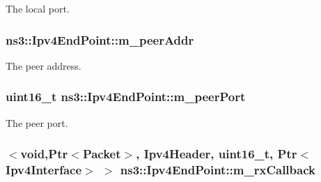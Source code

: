 The local port. 

\subsubsection[{\texorpdfstring{m\+\_\+peer\+Addr}{m_peerAddr}}]{ ns3\+::\+Ipv4\+End\+Point\+::m\+\_\+peer\+Addr\hspace{0.3cm}{\ttfamily [private]}}\hypertarget{classns3_1_1Ipv4EndPoint_a8c44fb581a066c052302912a5ade04b2}{}\label{classns3_1_1Ipv4EndPoint_a8c44fb581a066c052302912a5ade04b2}


The peer address. 

\subsubsection[{\texorpdfstring{m\+\_\+peer\+Port}{m_peerPort}}]{\setlength{\rightskip}{0pt plus 5cm}uint16\+\_\+t ns3\+::\+Ipv4\+End\+Point\+::m\+\_\+peer\+Port\hspace{0.3cm}{\ttfamily [private]}}\hypertarget{classns3_1_1Ipv4EndPoint_a90c4b5fd81d6d3d7628eb36f1c42f16a}{}\label{classns3_1_1Ipv4EndPoint_a90c4b5fd81d6d3d7628eb36f1c42f16a}


The peer port. 

\subsubsection[{\texorpdfstring{m\+\_\+rx\+Callback}{m_rxCallback}}]{$<$void,{\bf Ptr}$<${\bf Packet}$>$, {\bf Ipv4\+Header}, uint16\+\_\+t, {\bf Ptr}$<${\bf Ipv4\+Interface}$>$ $>$ ns3\+::\+Ipv4\+End\+Point\+::m\+\_\+rx\+Callback\hspace{0.3cm}{\ttfamily [private]}}\hypertarget{classns3_1_1Ipv4EndPoint_af4bc9cde477a79aa4cf17d886106c507}{}\label{classns3_1_1Ipv4EndPoint_af4bc9cde477a79aa4cf17d886106c507}


